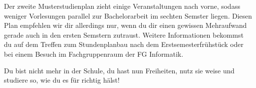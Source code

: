 Der zweite Musterstudienplan zieht einige Veranstaltungen nach vorne, sodass weniger Vorlesungen parallel zur Bachelorarbeit im sechten Semster liegen. Diesen Plan empfehlen wir dir allerdings nur, wenn du dir einen gewissen Mehraufwand gerade auch in den ersten Semstern zutraust. Weitere Informationen bekommst du auf dem Treffen zum Stundenplanbau nach dem Erstsemesterfrühstück oder bei einem Besuch im Fachgruppenraum der FG Informatik.






Du bist nicht mehr in der Schule, du hast nun Freiheiten, nutz sie weise und studiere so, wie du es für richtig hälst!
